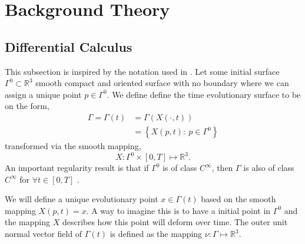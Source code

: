 

\section{Background Theory}%
\label{sec:differential_geometry}


\subsection{Differential Calculus}%
\label{sub:differential_calculus}

This subsection is inspired by the notation used in \cite{kovacs2021convergent, dougan2012first}.
Let some initial surface $\Gamma^{0} \subset \mathbb{R} ^3  $ smooth compact and oriented surface with no boundary where we can assign a unique point $p \in \Gamma ^{0}$. We define define the time evolutionary surface to be on the form,
\[
    \begin{split}
\Gamma  = \Gamma \left( t \right) & = \Gamma \left( X \left(\cdot ,t \right)  \right) \\
                                  &= \left\{ X \left( p,t \right): \ p \in \Gamma^{0}  \right\}
    \end{split}
\]
transformed via the smooth mapping,
\[
X : \Gamma^{0} \times  \left[ 0,T \right]  \mapsto  \mathbb{R} ^3.
\]
An important regularity result is that if $\Gamma ^{0}$ is of class $C^{\infty}$, then $\Gamma $ is also of class $C^{\infty}$ for $\forall t \in \left[ 0,T \right] $ \cite{sokolowski1992introduction, dougan2012first}.

We will define a unique evolutionary point $x \in \Gamma \left( t \right) $ based on the smooth mapping $X \left( p,t \right) = x$. A way to imagine this is to have a initial point in $\Gamma ^{0}$ and the mapping $X $ describes how this point will deform over time. The outer unit normal vector field of $\Gamma \left( t \right) $ is defined as the mapping $\nu : \Gamma \mapsto
\mathbb{R} ^{3}$.

